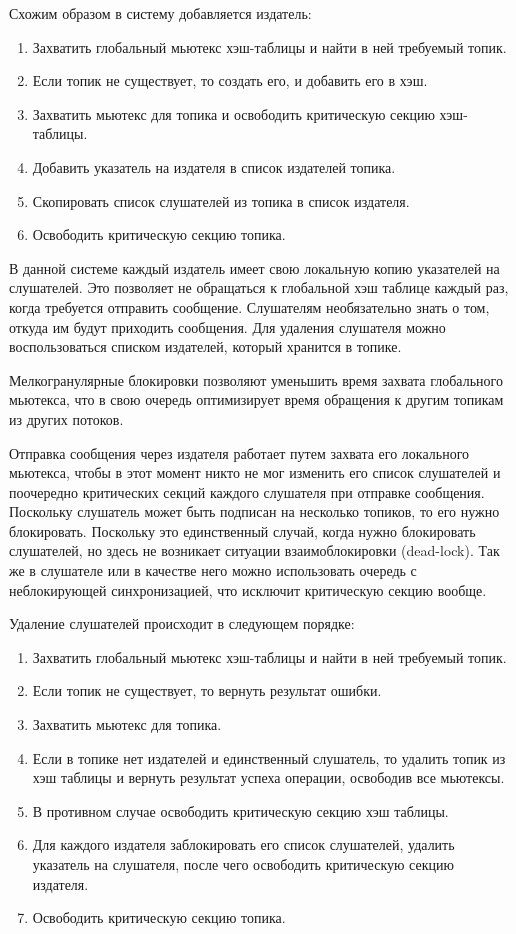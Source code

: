Схожим образом в систему добавляется издатель:

\begin{enumerate}
	\item Захватить глобальный мьютекс хэш-таблицы и найти в ней требуемый топик.
	\item Если топик не существует, то создать его, и добавить его в хэш.
	\item Захватить мьютекс для топика и освободить критическую секцию хэш-таблицы.
	\item Добавить указатель на издателя в список издателей топика.
	\item Скопировать список слушателей из топика в список издателя.
	\item Освободить критическую секцию топика.
\end{enumerate}

В данной системе каждый издатель имеет свою локальную копию указателей на слушателей. Это позволяет не обращаться к глобальной хэш таблице каждый раз, когда требуется отправить сообщение. Слушателям необязательно знать о том, откуда им будут приходить сообщения. Для удаления слушателя можно воспользоваться списком издателей, который хранится в топике.

Мелкогранулярные блокировки позволяют уменьшить время захвата глобального мьютекса, что в свою очередь оптимизирует время обращения к другим топикам из других потоков.

Отправка сообщения через издателя работает путем захвата его локального мьютекса, чтобы в этот момент никто не мог изменить его список слушателей и поочередно критических секций каждого слушателя при отправке сообщения. Поскольку слушатель может быть подписан на несколько топиков, то его нужно блокировать. Поскольку это единственный случай, когда нужно блокировать слушателей, но здесь не возникает ситуации взаимоблокировки (dead-lock). Так же в слушателе или в качестве него можно использовать очередь с неблокирующей синхронизацией, что исключит критическую секцию вообще.

Удаление слушателей происходит в следующем порядке:

\begin{enumerate}
	\item Захватить глобальный мьютекс хэш-таблицы и найти в ней требуемый топик.
	\item Если топик не существует, то вернуть результат ошибки.
	\item Захватить мьютекс для топика.
	\item Если в топике нет издателей и единственный слушатель, то удалить топик из хэш таблицы и вернуть результат успеха операции, освободив все мьютексы.
	\item В противном случае освободить критическую секцию хэш таблицы.
	\item Для каждого издателя заблокировать его список слушателей, удалить указатель на слушателя, после чего освободить критическую секцию издателя.
	\item Освободить критическую секцию топика.
\end{enumerate}

